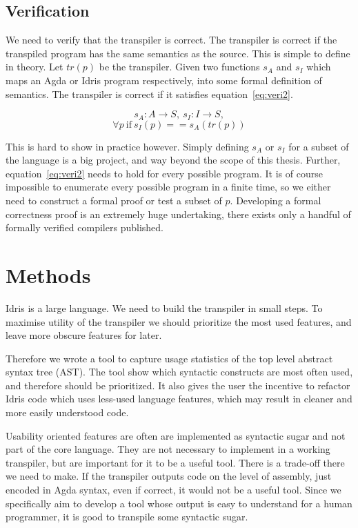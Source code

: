 \documentclass[parskip=half]{scrartcl}
\begin{document}
\subsection{Verification}\label{sec:veri}

We need to verify that the transpiler is correct. The transpiler is correct if
the transpiled program has the same semantics as the source.
This is simple to define in theory.
Let $tr(p)$ be the transpiler.
Given two functions $s_A$ and $s_I$ which maps an Agda or Idris program
respectively, into some formal definition of semantics.
The transpiler is correct if it satisfies equation~\ref{eq:veri2}.

\begin{equation} \label{eq:veri1}
  s_A : A \rightarrow S,
  \ s_I : I \rightarrow S,
\end{equation}
\begin{equation} \label{eq:veri2}
  \forall p\ \text{if}\  s_I(p) == s_A (tr(p))
\end{equation}

This is hard to show in practice however. Simply defining $s_A$ or $s_I$ for
a subset of the language is a big project, and way beyond the scope of this
thesis.
Further, equation~\ref{eq:veri2} needs to hold for every possible program.
It is of course impossible to enumerate every possible program in a finite
time, so we either need to construct a formal proof or test a subset of $p$.
Developing a formal correctness proof is an extremely huge undertaking, there
exists only a handful of formally verified compilers published.


\section{Methods}
Idris is a large language. We need to build the transpiler in small steps. To
maximise utility of the transpiler we should prioritize the most used features,
and leave more obscure features for later.

Therefore we wrote a tool to capture usage statistics of the top level abstract
syntax tree (AST). The tool show which syntactic constructs are most often
used, and therefore should be prioritized. It also gives the user the
incentive to refactor Idris code which uses less-used language features,
which may result in cleaner and more easily understood code.

Usability oriented features are often are implemented as syntactic sugar and
not part of the core language. They are not necessary to implement in a working
transpiler, but are important for it to be a useful tool. There is a trade-off
there we need to make. If the transpiler outputs code on the level of
assembly, just encoded in Agda syntax, even if correct, it would not be a useful
tool. Since we specifically aim to develop a tool whose output is easy to
understand for a human programmer, it is good to transpile some syntactic sugar.
\end{document}
